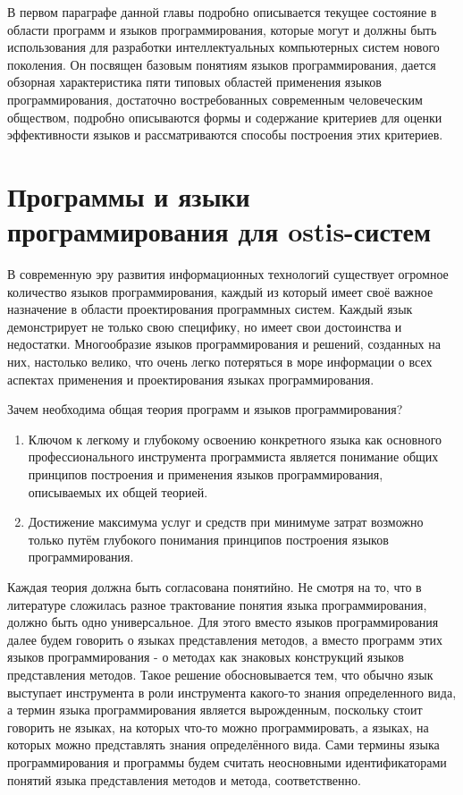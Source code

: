 В первом параграфе данной главы подробно описывается текущее состояние в области программ и языков программирования,
которые могут и должны быть использования для разработки интеллектуальных компьютерных систем нового поколения. Он
посвящен базовым понятиям языков программирования, дается обзорная характеристика пяти типовых областей применения
языков программирования, достаточно востребованных современным человеческим обществом, подробно описываются формы и
содержание критериев для оценки эффективности языков и рассматриваются способы построения этих критериев.


\section{Программы и языки программирования для ostis-систем}

В современную эру развития информационных технологий существует огромное количество языков программирования, каждый из
который имеет своё важное назначение в области проектирования программных систем. Каждый язык демонстрирует не только
свою специфику, но имеет свои достоинства и недостатки. Многообразие языков программирования и решений, созданных
на них, настолько велико, что очень легко потеряться в море информации о всех аспектах применения и проектирования
языках программирования.

Зачем необходима общая теория программ и языков программирования?
\begin{enumerate}
    \item Ключом к легкому и глубокому освоению конкретного языка как основного профессионального инструмента
    программиста является понимание общих принципов построения и применения языков программирования, описываемых их
    общей теорией.
    \item Достижение максимума услуг и средств при минимуме затрат возможно только путём глубокого понимания принципов
    построения языков программирования.
\end{enumerate}

Каждая теория должна быть согласована понятийно. Не смотря на то, что в литературе сложилась разное трактование понятия
языка программирования, должно быть одно универсальное. Для этого вместо языков программирования далее будем говорить о
языках представления методов, а вместо программ этих языков программирования - о методах как знаковых конструкций языков
представления методов. Такое решение обосновывается тем, что обычно язык выступает инструмента в роли инструмента
какого-то знания определенного вида, а термин языка программирования является вырожденным, поскольку стоит говорить не
языках, на которых что-то можно программировать, а языках, на которых можно представлять знания определённого вида.
Сами термины языка программирования и программы будем считать неосновными идентификаторами понятий языка представления
методов и метода, соответственно.

